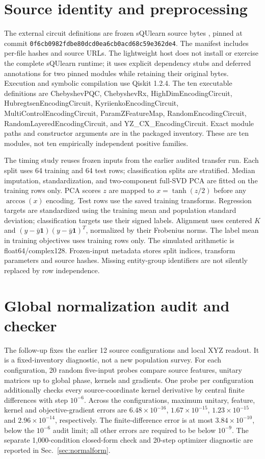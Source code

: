 \section{Source identity and preprocessing}
\label{app:source}
{\raggedright
The external circuit definitions are frozen sQUlearn source bytes
\cite{squlearn}, pinned at commit
\texttt{0f6cb0982fdbe80dcd0ea6cb0acd68c59e362de4}.
The manifest includes per-file hashes and source URLs. The lightweight
host does not install or exercise the complete sQUlearn runtime;
it uses explicit dependency stubs and deferred annotations for two
pinned modules while retaining their original bytes. Execution and
symbolic compilation use Qiskit 1.2.4. The ten executable definitions are
ChebyshevPQC, ChebyshevRx, HighDimEncodingCircuit, HubregtsenEncodingCircuit,
KyriienkoEncodingCircuit, MultiControlEncodingCircuit, ParamZFeatureMap,
RandomEncodingCircuit, RandomLayeredEncodingCircuit, and YZ\_CX\_EncodingCircuit.
Exact module paths and constructor arguments are in the packaged inventory.
These are ten modules, not ten empirically independent positive families.\par}

The timing study reuses frozen inputs from the earlier audited transfer
run. Each split uses 64 training and 64 test rows; classification splits
are stratified. Median imputation, standardization, and two-component
full-SVD PCA are fitted on the training rows only. PCA scores $z$ are
mapped to $x=\tanh(z/2)$ before any $\arccos(x)$ encoding. Test rows
use the saved training transforms. Regression targets are standardized
using the training mean and population standard deviation; classification
targets use their signed labels. Alignment uses centered $K$ and
$(y-\bar y\mathbf1)(y-\bar y\mathbf1)^T$, normalized by their Frobenius
norms. The label mean in training objectives uses training rows only.
The simulated arithmetic is float64/complex128. Frozen-input metadata
stores split indices, transform parameters and source hashes. Missing
entity-group identifiers are not silently replaced by row independence.

\section{Global normalization audit and checker}
\label{app:global}
The follow-up fixes the earlier 12 source configurations and local XYZ
readout. It is a fixed-inventory diagnostic, not a new population survey.
For each configuration, 20 random five-input probes compare source
features, unitary matrices up to global phase, kernels and gradients.
One probe per configuration additionally checks every source-coordinate
kernel derivative by central finite differences with step $10^{-6}$.
Across the configurations, maximum unitary, feature, kernel and
objective-gradient errors are $6.48\times10^{-16}$,
$1.67\times10^{-15}$, $1.23\times10^{-15}$ and
$2.96\times10^{-14}$, respectively. The finite-difference error is
at most $3.84\times10^{-10}$, below the $10^{-6}$ audit limit;
all other errors are required to be below $10^{-9}$.
The separate 1,000-condition closed-form check and 20-step optimizer
diagnostic are reported in Sec.~\ref{sec:normalform}.

